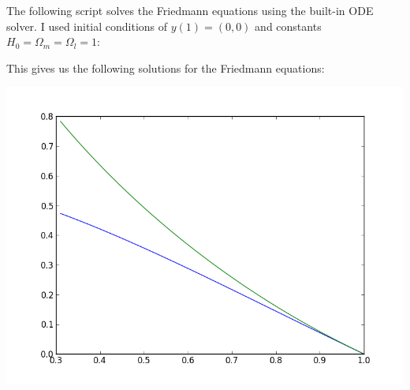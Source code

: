 \documentclass[%
]
{scrartcl}
\theoremstyle{plain}
\begin{document}
The following script solves the Friedmann equations using the built-in ODE solver. I used initial conditions of $y(1)=(0, 0)$ and constants $H_{0}=\Omega_{m}=\Omega_{l}=1$:



This gives us the following solutions for the Friedmann equations:

\begin{center}
\centering
\includegraphics[width=0.6\linewidth]{../friedmann.png}
\end{center}

%
\end{document}
